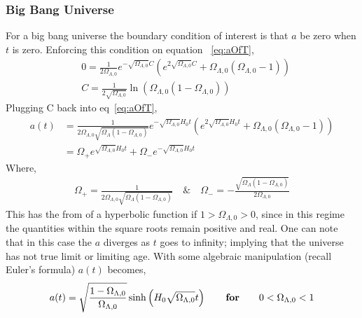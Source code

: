 \documentclass[twoside]{article}
\begin{document}
\subsubsection{Big Bang Universe}\label{s:abigbang}
For a big bang universe the boundary condition of interest is that $a$ be zero when $t$ is zero. Enforcing this condition on equation ~\ref{eq:aOfT},
\begin{align}
&0 = \frac{1}{2\Omega_{\Lambda,0}} e^{-\sqrt{\Omega_{\Lambda,0}}C}\left(e^{2\sqrt{\Omega_{\Lambda,0}}C}+\Omega_{\Lambda,0}(\Omega_{\Lambda,0}-1)\right)\\
&C = \frac{1}{{2\sqrt{\Omega_{\Lambda,0}}}}\ln\left(\Omega_{\Lambda,0}(1-\Omega_{\Lambda,0})\right) 
\end{align}
Plugging C back into eq~\ref{eq:aOfT},
\begin{align}
a(t) &= \frac{1}{2\Omega_{\Lambda,0}\sqrt{\Omega_{\Lambda}(1-\Omega_{\Lambda,0})}} e^{-\sqrt{\Omega_{\Lambda,0}}H_{0}t}\left(e^{2\sqrt{\Omega_{\Lambda,0}}H_{0}t}+\Omega_{\Lambda,0}(\Omega_{\Lambda,0}-1)\right)\\
&= \Omega_{+}e^{\sqrt{\Omega_{\Lambda,0}}H_{0}t}+\Omega_{-}e^{-\sqrt{\Omega_{\Lambda,0}}H_{0}t}
\end{align}
Where,
\begin{align}
\Omega_{+} = \frac{1}{2\Omega_{\Lambda,0}\sqrt{\Omega_{\Lambda}(1-\Omega_{\Lambda,0})}} \quad\&\quad \Omega_{-} = -\frac{\sqrt{\Omega_{\Lambda}(1-\Omega_{\Lambda,0})}}{2\Omega_{\Lambda,0}}
 \end{align}
This has the from of a hyperbolic function if $1>\Omega_{\Lambda,0}>0$, since in this regime the quantities within the square roots remain positive and real. One can note that in this case the $a$ diverges as $t$ goes to infinity; implying that the universe has not true limit or limiting age. With some algebraic manipulation (recall Euler's formula) $a(t)$ becomes,
\begin{align}
a(t) = \sqrt{\frac{1-\Omega_{\Lambda,0}}{\Omega_{\Lambda,0}}}\sinh\left(H_{0}\sqrt{\Omega_{\Lambda,0}}t\right)\qquad \text{\textbf{for}}\qquad 0<\Omega_{\Lambda,0}<1 \label{eq:aOfT1}
\end{align}
\end{document}
